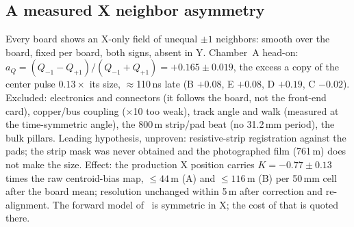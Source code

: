 \subsection{A measured X neighbor asymmetry}\label{sec:xasym}
Every board shows an X-only field of unequal $\pm1$ neighbors: smooth over the board, fixed per
board, both signs, absent in Y. Chamber~A head-on: $a_Q=(Q_{-1}-Q_{+1})/(Q_{-1}+Q_{+1})=+0.165\pm0.019$, the excess a copy of
the center pulse $0.13\times$ its size, $\approx$110\,ns late (B $+0.08$, E $+0.08$, D $+0.19$, C $-0.02$).
Excluded: electronics and connectors (it follows the board, not the front-end card), copper/bus coupling ($\times$10 too weak),
track angle and walk (measured at the time-symmetric angle), the 800\,\textmu m strip/pad beat (no 31.2\,mm period),
the bulk pillars. Leading hypothesis, unproven: resistive-strip registration against the pads; the strip mask was
never obtained and the photographed film (761\,\textmu m) does not make the size. Effect: the production X position
carries $K=-0.77\pm0.13$ times the raw centroid-bias map, $\le44$\,\textmu m (A) and $\le116$\,\textmu m (B) per
50\,mm cell after the board mean; resolution unchanged within 5\,\textmu m after correction and re-alignment. The
forward model of~\cite{paperII} is symmetric in X; the cost of that is quoted there.

